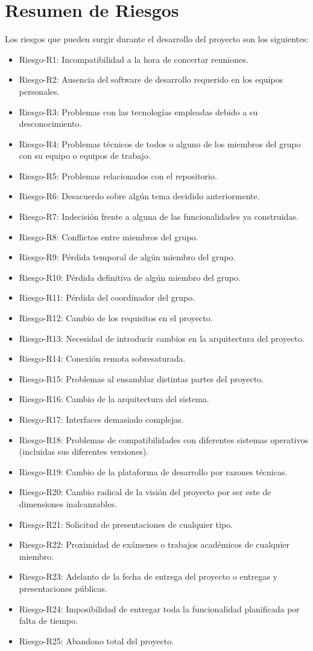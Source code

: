 \chapter{Resumen de Riesgos}
Los riesgos que pueden surgir durante el desarrollo del proyecto son los siguientes:
		\begin{itemize}
				\item Riesgo-R1: Incompatibilidad a la hora de concertar reuniones.
				\item Riesgo-R2: Ausencia del software de desarrollo requerido en los equipos personales.
				\item Riesgo-R3: Problemas con las tecnologías empleadas debido a su desconocimiento.
				\item Riesgo-R4: Problemas técnicos de todos o alguno de los miembros del grupo con su equipo o equipos de trabajo.
				\item Riesgo-R5: Problemas relacionados con el repositorio.
				\item Riesgo-R6: Desacuerdo sobre algún tema decidido anteriormente.
				\item Riesgo-R7: Indecisión frente a alguna de las funcionalidades ya construidas.
				\item Riesgo-R8: Conflictos entre miembros del grupo.
				\item Riesgo-R9: Pérdida temporal de algún miembro del grupo.
				\item Riesgo-R10: Pérdida definitiva de algún miembro del grupo.
				\item Riesgo-R11: Pérdida del coordinador del grupo.
				\item Riesgo-R12: Cambio de los requisitos en el proyecto.
				\item Riesgo-R13: Necesidad de introducir cambios en la arquitectura del proyecto.	
				\item Riesgo-R14: Conexión remota sobresaturada.
				\item Riesgo-R15: Problemas al ensamblar distintas partes del proyecto.
				\item Riesgo-R16: Cambio de la arquitectura del sistema.
				\item Riesgo-R17: Interfaces demasiado complejas.
				\item Riesgo-R18: Problemas de compatibilidades con diferentes sistemas operativos (incluidas sus diferentes versiones).
				\item Riesgo-R19: Cambio de la plataforma de desarrollo por razones técnicas.
				\item Riesgo-R20: Cambio radical de la visión del proyecto por ser este de dimensiones inalcanzables.
				\item Riesgo-R21: Solicitud de presentaciones de cualquier tipo.
				\item Riesgo-R22: Proximidad de exámenes o trabajos académicos de cualquier miembro.
				\item Riesgo-R23: Adelanto de la fecha de entrega del proyecto o entregas y presentaciones públicas.
				\item Riesgo-R24: Imposibilidad de entregar toda la funcionalidad planificada por falta de tiempo.
				\item Riesgo-R25: Abandono total del proyecto.				
		\end{itemize}